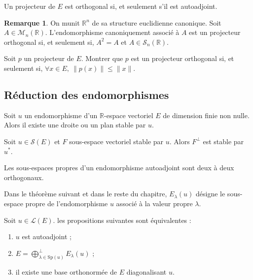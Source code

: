 \documentclass[french]{article}
\newcommand{\R}{\mathbb{R}}
\newcommand{\st}{^*}
\theoremstyle{plain}
\theoremstyle{definition}
\newtheorem*{rmq}{Remarque}
\theoremstyle{remark}
\begin{document}
\begin{prop}
	Un projecteur de $E$ est orthogonal si, et seulement s'il est autoadjoint.
\end{prop}

\begin{rmq}
	On munit $\R^n$ de sa structure euclidienne canonique. Soit $A\in\mathcal{M}_n(\R)$. L'endomorphisme canoniquement associé à $A$ est un projecteur orthogonal si, et seulement si, $A^2=A$ et $A\in\mathcal{S}_n(\R)$.
\end{rmq}

\begin{exo}
	Soit $p$ un projecteur de $E$. Montrer que $p$ est un projecteur orthogonal si, et seulement si, $\forall x\in E,\ \lVert p(x)\rVert\leqslant\lVert x\rVert$.
\end{exo}

\subsection{Réduction des endomorphismes}

\begin{lem}
	Soit $u$ un endomorphisme d'un $\R$-espace vectoriel $E$ de dimension finie non nulle. Alors il existe une droite ou un plan stable par $u$.
\end{lem}

\begin{prop}
	Soit $u\in\mathcal{S}(E)$ et $F$ sous-espace vectoriel stable par $u$. Alors $F^\bot$ est stable par $u\st$.
\end{prop}

\begin{lem}
	Les sous-espaces propres d'un endomorphisme autoadjoint sont deux à deux orthogonaux.
\end{lem}

Dans le théorème suivant et dans le reste du chapitre, $E_\lambda(u)$ désigne le sous-espace propre de l'endomorphisme $u$ associé à la valeur propre $\lambda$.

\begin{thm}
	Soit $u\in\mathcal{L}(E)$. les propositions suivantes sont équivalentes :
	\begin{enumerate}
		\item $u$ est autoadjoint ;
		\item $\displaystyle E=\bigoplus_{\lambda\in\text{Sp}(u)}^{\bot}E_\lambda(u)$ ;
		\item il existe une base orthonormée de $E$ diagonalisant $u$.
	\end{enumerate}
\end{thm}
\end{document}
